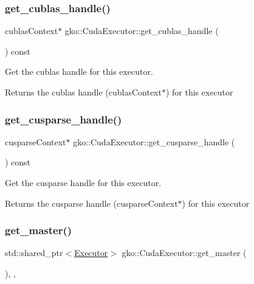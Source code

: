 \subsubsection{\texorpdfstring{get\+\_\+cublas\+\_\+handle()}{get\_cublas\_handle()}}
{\footnotesize\ttfamily cublas\+Context$\ast$ gko\+::\+Cuda\+Executor\+::get\+\_\+cublas\+\_\+handle (\begin{DoxyParamCaption}{ }\end{DoxyParamCaption}) const}



Get the cublas handle for this executor. 

\begin{DoxyReturn}{Returns}
the cublas handle (cublas\+Context$\ast$) for this executor 
\end{DoxyReturn}
\mbox{\label{classgko_1_1CudaExecutor_ade84197157cc2695e5c94310692ab323}} 
\subsubsection{\texorpdfstring{get\+\_\+cusparse\+\_\+handle()}{get\_cusparse\_handle()}}
{\footnotesize\ttfamily cusparse\+Context$\ast$ gko\+::\+Cuda\+Executor\+::get\+\_\+cusparse\+\_\+handle (\begin{DoxyParamCaption}{ }\end{DoxyParamCaption}) const}



Get the cusparse handle for this executor. 

\begin{DoxyReturn}{Returns}
the cusparse handle (cusparse\+Context$\ast$) for this executor 
\end{DoxyReturn}
\mbox{\label{classgko_1_1CudaExecutor_a59a618e0d48b42fe699e9d4cf347b491}} 
\subsubsection{\texorpdfstring{get\+\_\+master()}{get\_master()}\hspace{0.1cm}{\footnotesize\ttfamily [1/2]}}
{\footnotesize\ttfamily std\+::shared\+\_\+ptr$<$\hyperlink{classgko_1_1Executor}{Executor}$>$ gko\+::\+Cuda\+Executor\+::get\+\_\+master (\begin{DoxyParamCaption}{ }\end{DoxyParamCaption})\hspace{0.3cm}{\ttfamily [override]}, {\ttfamily [virtual]}, {\ttfamily [noexcept]}}



